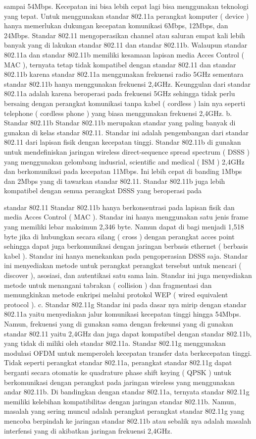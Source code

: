 sampai 54Mbps. Kecepatan ini bisa lebih cepat lagi bisa menggunakan teknologi yang
tepat.
Untuk menggunakan standar 802.11a perangkat komputer ( device ) hanya memerlukan
dukungan kecepatan komunikasi 6Mbps, 12Mbps, dan 24Mbps. Standar 802.11
mengoperasikan channel atau saluran empat kali lebih banyak yang di lakukan standar
802.11 dan standar 802.11b. Walaupun standar 802.11a dan standar 802.11b memiliki
kesamaan lapisan media Acces Control ( MAC ), ternyata tetap tidak kompatibel dengan
standar 802.11 dan standar 802.11b karena standar 802.11a menggunakan frekuensi radio
5GHz sementara standar 802.11b hanya menggunakan frekuensi 2,4GHz.
Keunggulan dari standar 802.11a adalah karena beroperasi pada frekuensi 5GHz sehingga
tidak perlu bersaing dengan perangkat komunikasi tanpa kabel ( cordless ) lain nya seperti
telephone ( cordless phone ) yang biasa menggunakan frekuensi 2,4GHz.
b. Standar 802.11b
Standar 802.11b merupakan standar yang paling banyak di gunakan di kelas standar
802.11. Standar ini adalah pengembangan dari standar 802.11 dari lapisan fisik dengan
kecepatan tinggi. Standar 802.11b di gunakan untuk mendefiniskan jaringan wireless
direct-sequence spread spectrum ( DSSS ) yang menggunakan gelombang indusrial,
scientific and medical ( ISM ) 2,4GHz dan berkomunikasi pada kecepatan 11Mbps. Ini
lebih cepat di banding 1Mbps dan 2Mbps yang di tawarkan standar 802.11. Standar
802.11b juga lebih kompatibel dengan semua perangkat DSSS yang beroperasi pada

standar 802.11
Standar 802.11b hanya berkonsentrasi pada lapisan fisik dan media Acces Control ( MAC
). Standar ini hanya menggunakan satu jenis frame yang memiliki lebar maksimun 2,346
byte. Namun dapat di bagi menjadi 1,518 byte jika di hubungkan secara silang ( cross )
dengan perangkat acces point sehingga dapat juga berkomunikasi dengan jaringan
berbasis ethernet ( berbasis kabel ).
Standar ini hanya menekankan pada pengoperasian DSSS saja. Standar ini menyediakan
metode untuk perangkat perangkat tersebut untuk mencari ( discover ), asosiasi, dan
autentikasi satu sama lain. Standar ini juga menyediakan metode untuk menangani
tabrakan ( collision ) dan fragmentasi dan memungkinkan metode enkripsi melalui
protokol WEP ( wired equivalent protocol ).
c. Standar 802.11g
Standar ini pada dasar nya mirip dengan standar 802.11a yaitu menyediakan jalur
komunikasi kecepatan tinggi hingga 54Mbps. Namun, frekuensi yang di gunakan sama
dengan frekeunsi yang di gunakan standar 802.11 yaitu 2,4GHz dan juga dapat
kompatibel dengan standar 802.11b, yang tidak di miliki oleh standar 802.11a.
Standar 802.11g menggunakan modulasi OFDM untuk memperoleh kecepatan transfer
data berkecepatan tinggi. Tidak seperti perangkat standar 802.11a, perangkat standar
802.11g dapat berganti secara otomatis ke quadrature phase shift keying ( QPSK ) untuk
berkomunikasi dengan perangkat pada jaringan wireless yang menggunakan andar
802.11b.
Di bandingkan dengan standar 802.11a, ternyata standar 802.11g memiliki kelebihan
kompatibilitas dengan jaringan standar 802.11b. Namun, masalah yang sering muncul
adalah perangkat perangkat standar 802.11g yang mencoba berpindah ke jaringan standar
802.11b atau sebalik nya adalah masalah interfensi yang di akibatkan jaringan frekuensi
2,4GHz.
 
